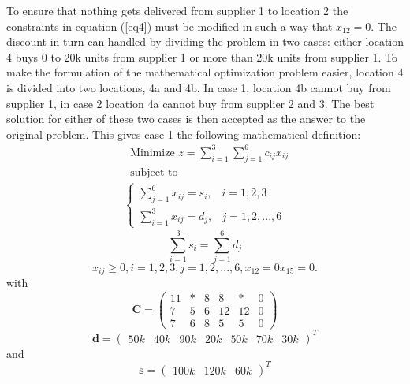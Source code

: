\documentclass{article}
\begin{document}
  \noindent
  To ensure that nothing gets delivered from supplier 1 to location 2 the
  constraints in equation (\ref{eq4}) must be modified in such a way that
  $x_{12} = 0$. The discount in turn can handled by dividing
  the problem in two cases: either location 4 buys 0 to 20k units from supplier
  1 or more than 20k units from supplier 1.
  To make the formulation of the mathematical optimization problem easier,
  location 4 is divided into two locations, 4a and 4b.
  In case 1, location 4b cannot buy from supplier 1, in
  case 2 location 4a cannot buy from supplier 2 and 3. The best solution for
  either of these two cases is then accepted as the answer to the original
  problem. This gives case 1 the following mathematical definition:
  \begin{align*}
  & \text{Minimize } z = \sum_{i=1}^{3}\sum_{j=1}^6 c_{ij}x_{ij} \\
  & \text{subject to}
    \label{eq10}
  \end{align*}
  \begin{align}
    \begin{cases}
      \sum_{j=1}^{6} x_{ij} = s_{i}, & i = 1, 2, 3 \\
      \sum_{i=1}^{3} x_{ij} = d_{j}, & j = 1, 2, ..., 6
    \end{cases}
  \end{align}
  \begin{equation}
    \sum_{i=1}^{3} s_{i} = \sum_{j=1}^6 d_{j}
    \label{eq12}
  \end{equation}
  \begin{equation}
    x_{ij} \geq 0, i = 1, 2, 3, j = 1, 2, ..., 6, x_{12} = 0 x_{15} = 0.
    \label{eq13}
  \end{equation}
  with
  \begin{equation}
    \mathbf{C} =
    \begin{pmatrix}
      11 & * & 8 & 8  & *  & 0\\
      7  & 5 & 6 & 12 & 12 & 0\\
      7  & 6 & 8 & 5  & 5  & 0
    \end{pmatrix}
    \label{eq14}
  \end{equation}
  \begin{equation}
    \mathbf{d} =
    \begin{pmatrix}
      50k & 40k & 90k & 20k & 50k & 70k & 30k
    \end{pmatrix}^T
    \label{eq15}
  \end{equation}
  and
  \begin{equation}
    \mathbf{s} =
    \begin{pmatrix}
      100k & 120k & 60k
    \end{pmatrix}^T
    \label{eq16}
  \end{equation}
\end{document}
